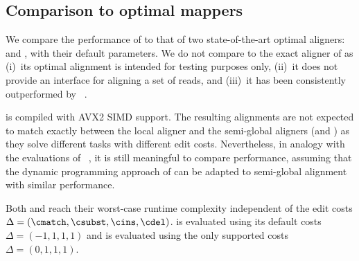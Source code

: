 \subsection{Comparison to optimal mappers}

We compare the performance of \astarix to that of two state-of-the-art optimal
aligners: \pasgal and \bitparallel, with their default parameters.
%
We do not compare to the exact aligner of \vg as (i)~its optimal alignment
is intended for testing purposes only, (ii)~it does not provide an
interface for aligning a set of reads, and (iii)~it has been consistently
outperformed by \pasgal~\cite{jain_accelerating_2019}.

\pasgal is compiled with AVX2 SIMD support. The resulting alignments are not
expected to match exactly between the local aligner \pasgal and the semi-global
aligners (\astarix and \bitparallel) as they solve different tasks with
different edit costs. Nevertheless, in analogy with the evaluations of
\pasgal~\cite{jain_accelerating_2019}, it is still meaningful to compare
performance, assuming that the dynamic programming approach of \pasgal can be
adapted to semi-global alignment with similar performance.

Both \bitparallel and \pasgal reach their worst-case runtime complexity
independent of the edit costs $\Delta=(\cmatch,\csubst,\cins,\cdel)$. \pasgal is
evaluated using its default costs ~$\Delta=(-1,1,1,1)$ and \bitparallel is
evaluated using the only supported costs~$\Delta=(0,1,1,1)$.